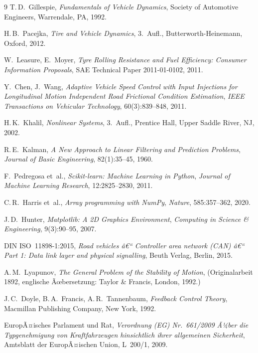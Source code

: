 ﻿\documentclass[a4paper,12pt]{article}
\theoremstyle{definition}
\begin{document}
\begin{thebibliography}{9}
T.\,D.~Gillespie,
\textit{Fundamentals of Vehicle Dynamics},
Society of Automotive Engineers, Warrendale, PA, 1992.

H.\,B.~Pacejka,
\textit{Tire and Vehicle Dynamics},
3.~Aufl., Butterworth-Heinemann, Oxford, 2012.

W.~Leasure, E.~Moyer,
\textit{Tyre Rolling Resistance and Fuel Efficiency: Consumer Information Proposals},
SAE Technical Paper 2011-01-0102, 2011.

Y.~Chen, J.~Wang,
\textit{Adaptive Vehicle Speed Control with Input Injections for Longitudinal Motion
Independent Road Frictional Condition Estimation},
\textit{IEEE Transactions on Vehicular Technology}, 60(3):839--848, 2011.

H.\,K.~Khalil,
\textit{Nonlinear Systems},
3.~Aufl., Prentice Hall, Upper Saddle River, NJ, 2002.

R.\,E.~Kalman,
\textit{A New Approach to Linear Filtering and Prediction Problems},
\textit{Journal of Basic Engineering}, 82(1):35--45, 1960.

F.~Pedregosa et~al.,
\textit{Scikit-learn: Machine Learning in Python},
\textit{Journal of Machine Learning Research}, 12:2825--2830, 2011.

C.\,R.~Harris et~al.,
\textit{Array programming with NumPy},
\textit{Nature}, 585:357--362, 2020.

J.\,D.~Hunter,
\textit{Matplotlib: A 2D Graphics Environment},
\textit{Computing in Science \& Engineering}, 9(3):90--95, 2007.

DIN ISO~11898-1:2015,
\textit{Road vehicles â€“ Controller area network (CAN) â€“ Part 1: Data link layer and physical signalling},
Beuth Verlag, Berlin, 2015.

A.\,M.~Lyapunov,
\textit{The General Problem of the Stability of Motion},
(Originalarbeit 1892, englische Ãœbersetzung: Taylor \& Francis, London, 1992.)

J.\,C.~Doyle, B.\,A.~Francis, A.\,R.~Tannenbaum,
\textit{Feedback Control Theory},
Macmillan Publishing Company, New York, 1992.

EuropÃ¤isches Parlament und Rat,
\textit{Verordnung (EG) Nr.~661/2009 Ã¼ber die Typgenehmigung von Kraftfahrzeugen
hinsichtlich ihrer allgemeinen Sicherheit},
Amtsblatt der EuropÃ¤ischen Union, L~200/1, 2009.


\end{thebibliography}
\end{document}
